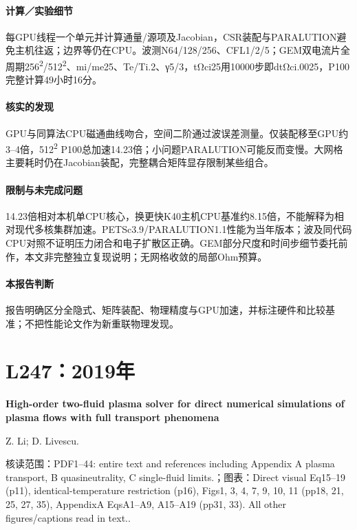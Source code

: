 \documentclass[UTF8,a4paper,11pt,openany,fontset=fandol]{ctexbook}
\begin{document}
\paragraph{计算／实验细节}每GPU线程一个单元并计算通量/源项及Jacobian，CSR装配与PARALUTION避免主机往返；边界等仍在CPU。波测N64/128/256、CFL1/2/5；GEM双电流片全周期256\textsuperscript{2}/512\textsuperscript{2}、mi/me25、Te/Ti.2、γ5/3，tΩci25用10000步即dtΩci.0025，P100完整计算49小时16分。

\paragraph{核实的发现}GPU与同算法CPU磁通曲线吻合，空间二阶通过波误差测量。仅装配移至GPU约3–4倍，512\textsuperscript{2} P100总加速14.23倍；小问题PARALUTION可能反而变慢。大网格主要耗时仍在Jacobian装配，完整耦合矩阵显存限制某些组合。

\paragraph{限制与未完成问题}14.23倍相对本机单CPU核心，换更快K40主机CPU基准约8.15倍，不能解释为相对现代多核集群加速。PETSc3.9/PARALUTION1.1性能为当年版本；波及同代码CPU对照不证明压力闭合和电子扩散区正确。GEM部分尺度和时间步细节委托前作，本文非完整独立复现说明；无网格收敛的局部Ohm预算。

\paragraph{本报告判断}报告明确区分全隐式、矩阵装配、物理精度与GPU加速，并标注硬件和比较基准；不把性能论文作为新重联物理发现。

\section{L247：2019年}\label{paper:L247}

\textbf{High-order two-fluid plasma solver for direct numerical simulations of plasma flows with full transport phenomena}\citep{L247}\

Z. Li;  D. Livescu.

\textsf{核读范围：}PDF1–44: entire text and references including Appendix A plasma transport,  B quasineutrality,  C single-fluid limits.；\textsf{图表：}Direct visual Eq15–19 (p11),  identical-temperature restriction (p16),  Figs1, 3, 4, 7, 9, 10, 11 (pp18, 21, 25, 27, 35),  AppendixA EqsA1–A9, A15–A19 (pp31, 33). All other figures/captions read in text..
\end{document}
